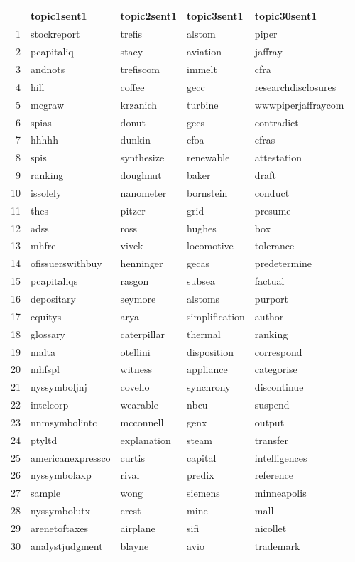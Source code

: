 \begin{table}[ht]
\centering
\begin{tabular}{rllll}
  \hline
 & topic1sent1 & topic2sent1 & topic3sent1 & topic30sent1 \\ 
  \hline
1 & stockreport & trefis & alstom & piper \\ 
  2 & pcapitaliq & stacy & aviation & jaffray \\ 
  3 & andnots & trefiscom & immelt & cfra \\ 
  4 & hill & coffee & gecc & researchdisclosures \\ 
  5 & mcgraw & krzanich & turbine & wwwpiperjaffraycom \\ 
  6 & spias & donut & gecs & contradict \\ 
  7 & hhhhh & dunkin & cfoa & cfras \\ 
  8 & spis & synthesize & renewable & attestation \\ 
  9 & ranking & doughnut & baker & draft \\ 
  10 & issolely & nanometer & bornstein & conduct \\ 
  11 & thes & pitzer & grid & presume \\ 
  12 & adss & ross & hughes & box \\ 
  13 & mhfre & vivek & locomotive & tolerance \\ 
  14 & ofissuerswithbuy & henninger & gecas & predetermine \\ 
  15 & pcapitaliqs & rasgon & subsea & factual \\ 
  16 & depositary & seymore & alstoms & purport \\ 
  17 & equitys & arya & simplification & author \\ 
  18 & glossary & caterpillar & thermal & ranking \\ 
  19 & malta & otellini & disposition & correspond \\ 
  20 & mhfspl & witness & appliance & categorise \\ 
  21 & nyssymboljnj & covello & synchrony & discontinue \\ 
  22 & intelcorp & wearable & nbcu & suspend \\ 
  23 & nnmsymbolintc & mcconnell & genx & output \\ 
  24 & ptyltd & explanation & steam & transfer \\ 
  25 & americanexpressco & curtis & capital & intelligences \\ 
  26 & nyssymbolaxp & rival & predix & reference \\ 
  27 & sample & wong & siemens & minneapolis \\ 
  28 & nyssymbolutx & crest & mine & mall \\ 
  29 & arenetoftaxes & airplane & sifi & nicollet \\ 
  30 & analystjudgment & blayne & avio & trademark \\ 
   \hline
\end{tabular}\label{tab:sent1}
\end{table}









